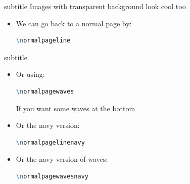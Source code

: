 \documentclass[aspectratio=169,11pt]{beamer}
\makeatletter
\let\zeropad\@anim@pad
\makeatother
\begin{document}
\darkpageline
\begin{frame}{\insertsection}{subtitle}
    Images with transparent background look cool too
    \begin{animateinline}[poster=last,autoplay,autopause,loop]{15}
    }
    \end{animateinline}
\end{frame}



\normalpageline
\begin{frame}[fragile]{\insertsection}
    \begin{itemize}
        \item We can go back to a normal page by: 
        \begin{lstlisting}[language=tcl,numbers=none]
\normalpageline\end{lstlisting}
    \end{itemize}
\end{frame}



\normalpagewaves
\begin{frame}[fragile]{\insertsection}{subtitle}
    \begin{itemize}
        \item Or using:
        \begin{lstlisting}[language=tcl,numbers=none]
\normalpagewaves\end{lstlisting}
        If you want some waves at the bottom 
    \end{itemize}
\end{frame}

\normalpagelinenavy
\begin{frame}[fragile]{\insertsection}
    \begin{itemize}
        \item Or the navy version: 
        \begin{lstlisting}[language=tcl,numbers=none]
\normalpagelinenavy\end{lstlisting}
    \end{itemize}
\end{frame}

\normalpagewavesnavy
\begin{frame}[fragile]{\insertsection}
    \begin{itemize}
        \item Or the navy version of waves: 
        \begin{lstlisting}[language=tcl,numbers=none]
\normalpagewavesnavy\end{lstlisting}
    \end{itemize}
\end{frame}
\end{document}
